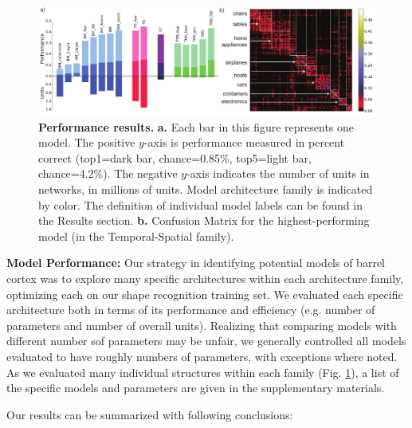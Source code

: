 \begin{figure}
\includegraphics [width=1\linewidth]{figures/results.pdf}
\vspace{-2mm}
\caption{\textbf{Performance results.} \textbf{a.} Each bar in this figure represents one model. The positive $y$-axis is performance measured in percent correct (top1=dark bar, chance=0.85\%, top5=light bar, chance=4.2\%).   The negative $y$-axis indicates the number of units in networks, in millions of units.  Model architecture family is indicated by color.  The definition of individual model labels can be found in the Results section. \textbf{b.} Confusion Matrix for the highest-performing model (in the Temporal-Spatial family).~\label{fig_main}}
\end{figure}

\textbf{Model Performance:} Our strategy in identifying potential models of barrel cortex was to explore many specific architectures within each architecture family, optimizing each on our shape recognition training set.  We evaluated each specific architecture both in terms of its performance and efficiency (e.g. number of parameters and number of overall units).
Realizing that comparing models with different number sof parameters may be unfair, we generally controlled all models evaluated to have roughly numbers of parameters, with exceptions where noted.
As we evaluated many individual structures within each family (Fig. \ref{fig_main}), a list of the specific models and parameters are given in the supplementary materials.

Our results can be summarized with following conclusions:

